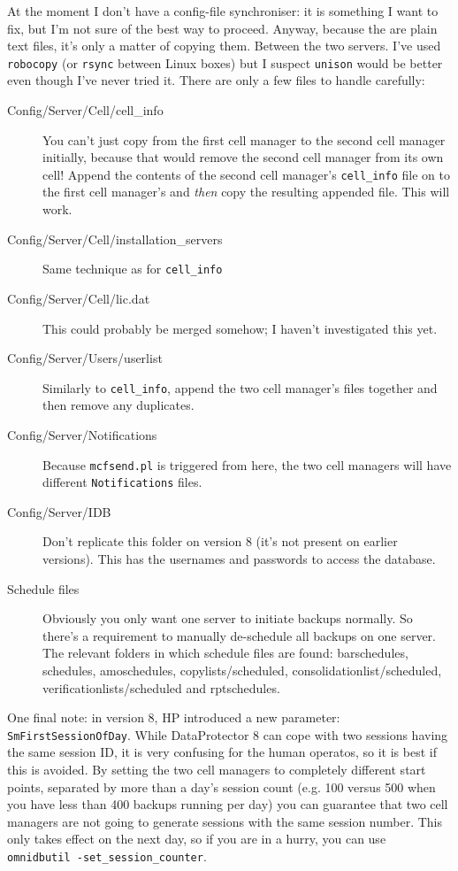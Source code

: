 \documentclass{article}
\begin{document}
At the moment I don't have a config-file synchroniser: it is something I want to fix, but I'm not sure of the best way to proceed. Anyway, because the are plain text files, it's only a matter
of copying them. Between the two servers. I've used {\tt robocopy} (or {\tt rsync} between Linux boxes) but I suspect {\tt unison} would be better even though I've never tried it. There are only a few files to handle carefully:
\begin{description}
\item[Config/Server/Cell/cell\_info] You can't just copy from the first cell manager to the second cell manager initially, because that would remove the second cell manager from its own cell! Append the contents of the second cell manager's {\tt cell\_info} file on to the first cell manager's and {\it then} copy the resulting appended file. This will work.
\item[Config/Server/Cell/installation\_servers] Same technique as for {\tt cell\_info}
\item[Config/Server/Cell/lic.dat] This could probably be merged somehow; I haven't investigated this yet.
\item[Config/Server/Users/userlist] Similarly to {\tt cell\_info}, append the two cell manager's files together and then remove any duplicates.
\item[Config/Server/Notifications] Because {\tt mcfsend.pl} is triggered from here, the two cell managers will have different {\tt Notifications} files.
\item[Config/Server/IDB] Don't replicate this folder on version 8 (it's not present on earlier versions). This has the usernames and passwords to access the database.
\item[Schedule files] Obviously you only want one server to initiate backups normally. So there's a requirement to manually de-schedule all backups on one server. The
relevant folders in which schedule files are found: barschedules, schedules, amoschedules, copylists/scheduled, consolidationlist/scheduled, verificationlists/scheduled and rptschedules. 
\end{description}

One final note: in version 8, HP introduced a new parameter: {\tt SmFirstSessionOfDay}. While DataProtector 8 can cope with two sessions having the same session ID, it is very
confusing for the human operatos, so it is best if this is avoided. By setting the two cell managers to completely different start points, separated by more than a day's session count (e.g. 100 versus 500 when you have less than 400 backups running per day) you can guarantee that two cell managers are not going to generate sessions with the same session number. This only takes effect on the next day, so if you are in a hurry, you can use {\tt omnidbutil -set\_session\_counter}. 
\end{document}
